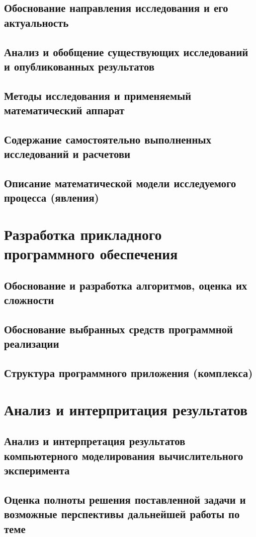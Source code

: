 \documentclass[14pt]{article}
\begin{document}
\subsection{Обоснование направления исследования и его актуальность}
\subsection{Анализ и обобщение существующих исследований и опубликованных результатов}
\subsection{Методы исследования и применяемый математический аппарат}
\subsection{Содержание самостоятельно выполненных исследований и расчетови}
\subsection{Описание математической модели исследуемого процесса (явления)}
\newpage
\section{Разработка прикладного программного обеспечения}
\subsection{Обоснование и разработка алгоритмов, оценка их сложности}
\subsection{Обоснование выбранных средств программной реализации}
\subsection{Структура программного приложения (комплекса)}
\newpage
\section{Анализ и интерпритация результатов}
\subsection{Анализ и интерпретация результатов компьютерного моделирования вычислительного эксперимента}
\subsection{Оценка полноты решения поставленной задачи и возможные перспективы дальнейшей работы по теме}
\newpage
\end{document}
